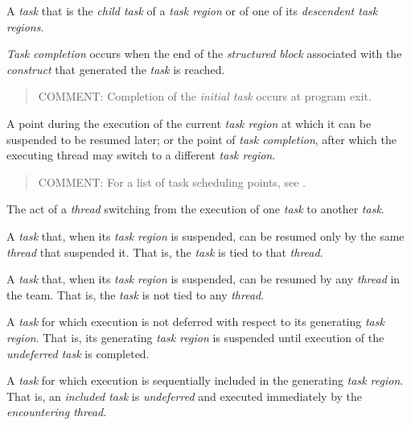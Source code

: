 \glossarydefstart
A \emph{task} that is the \emph{child task} of a \emph{task region} or of one of its 
\emph{descendent task regions}.
\glossarydefend

\glossarydefstart
\emph{Task completion} occurs when the end of the \emph{structured block} associated with the 
\emph{construct} that generated the \emph{task} is reached.

\begin{quote}
COMMENT: Completion of the \emph{initial task} occurs at program exit.
\end{quote}
\glossarydefend

\glossarydefstart
A point during the execution of the current \emph{task region} at which it can be 
suspended to be resumed later; or the point of \emph{task completion}, after which the 
executing thread may switch to a different \emph{task region}. 

\begin{quote}
COMMENT: For a list of task scheduling points, see .
\end{quote}
\glossarydefend

\glossarydefstart
The act of a \emph{thread} switching from the execution of one \emph{task} to another \emph{task}.
\glossarydefend

\glossarydefstart
A \emph{task} that, when its \emph{task region} is suspended, can be resumed only by the same 
\emph{thread} that suspended it. That is, the \emph{task} is tied to that \emph{thread}. 
\glossarydefend

\glossarydefstart
A \emph{task} that, when its \emph{task region} is suspended, can be resumed by any \emph{thread} in 
the team. That is, the \emph{task} is not tied to any \emph{thread}. 
\glossarydefend

\glossarydefstart
A \emph{task} for which execution is not deferred with respect to its generating \emph{task} 
\emph{region}. That is, its generating \emph{task region} is suspended until execution of the 
\emph{undeferred task} is completed.
\glossarydefend

\glossarydefstart
A \emph{task} for which execution is sequentially included in the generating \emph{task region}. 
That is, an \emph{included task} is \emph{undeferred} and executed immediately by the 
\emph{encountering thread}.
\glossarydefend

